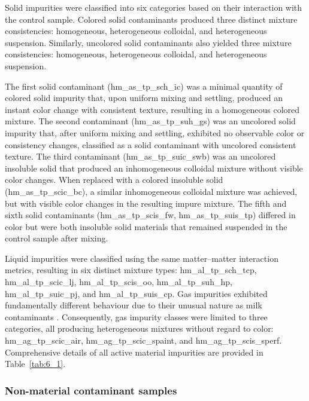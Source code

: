 \documentclass[12pt,a4paper,oneside]{report}
\begin{document}
Solid impurities were classified into six categories based on their interaction with the control sample. Colored solid contaminants produced three distinct mixture consistencies: homogeneous, heterogeneous colloidal, and heterogeneous suspension. Similarly, uncolored solid contaminants also yielded three mixture consistencies: homogeneous, heterogeneous colloidal, and heterogeneous suspension. 

The first solid contaminant (hm\_as\_tp\_sch\_ic) was a minimal quantity of colored solid impurity that, upon uniform mixing and settling, produced an instant color change with consistent texture, resulting in a homogeneous colored mixture. The second contaminant (hm\_as\_tp\_suh\_gs) was an uncolored solid impurity that, after uniform mixing and settling, exhibited no observable color or consistency changes, classified as a solid contaminant with uncolored consistent texture. The third contaminant (hm\_as\_tp\_suic\_swb) was an uncolored insoluble solid that produced an inhomogeneous colloidal mixture without visible color changes. When replaced with a colored insoluble solid (hm\_as\_tp\_scic\_bc), a similar inhomogeneous colloidal mixture was achieved, but with visible color changes in the resulting impure mixture. The fifth and sixth solid contaminants (hm\_as\_tp\_scis\_fw, hm\_as\_tp\_suis\_tp) differed in color but were both insoluble solid materials that remained suspended in the control sample after mixing.

Liquid impurities were classified using the same matter--matter interaction metrics, resulting in six distinct mixture types: hm\_al\_tp\_sch\_tcp, hm\_al\_tp\_scic\_lj, hm\_al\_tp\_scis\_oo, hm\_al\_tp\_suh\_hp, hm\_al\_tp\_suic\_pj, and hm\_al\_tp\_suis\_cp. Gas impurities exhibited fundamentally different behaviour due to their unusual nature as milk contaminants \cite{joolaei2025,chandra2024}. Consequently, gas impurity classes were limited to three categories, all producing heterogeneous mixtures without regard to color: hm\_ag\_tp\_scic\_air, hm\_ag\_tp\_scic\_spaint, and hm\_ag\_tp\_scis\_sperf. Comprehensive details of all active material impurities are provided in Table~\ref{tab:6_1}.

\subsubsection{Non-material contaminant samples}
\label{subsec:non-material_contaminant_samples_chapter6}
\end{document}
